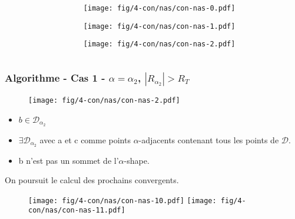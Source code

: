 \begin{frame}
\begin{columns}[t]
\begin{column}{0.7\linewidth}
  \end{column}
  \begin{column}{0.3\linewidth}
    {
      \begin{figure}[H]
        \centering
        \texttt{[image: fig/4-con/nas/con-nas-0.pdf]}
      \end{figure}
    }
    {
      \begin{figure}[H]
        \centering
        \texttt{[image: fig/4-con/nas/con-nas-1.pdf]}
      \end{figure}
    }
    {
      \begin{figure}[H]
        \centering
        \texttt{[image: fig/4-con/nas/con-nas-2.pdf]}
      \end{figure}
    }
  \end{column}
\end{columns}
\end{frame}

\begin{frame}
\frametitle{Algorithme - Cas 1 - $\alpha = \alpha_{2}$, $|R_{\alpha_{2}}| > R_T$}
{
  \begin{figure}[H]
    \centering
    \texttt{[image: fig/4-con/nas/con-nas-2.pdf]}
  \end{figure}
}

\begin{block}{}
\begin{itemize}
  \item $b \in \mathcal{D}_{\alpha_2}$
  \item $\exists \mathcal{D}_{\alpha_2}$ avec a et c comme points $\alpha$-adjacents contenant tous les points de $\mathcal{D}$.  
  \item \alert{b n'est pas un sommet de l'$\alpha$-shape.}
\end{itemize}

\end{block}

{
  \begin{block}{}
    On poursuit le calcul des prochains convergents.
  \end{block}

  \begin{figure}[H]
    \centering
    \texttt{[image: fig/4-con/nas/con-nas-10.pdf]}
    \texttt{[image: fig/4-con/nas/con-nas-11.pdf]}
  \end{figure}
}

\end{frame}

